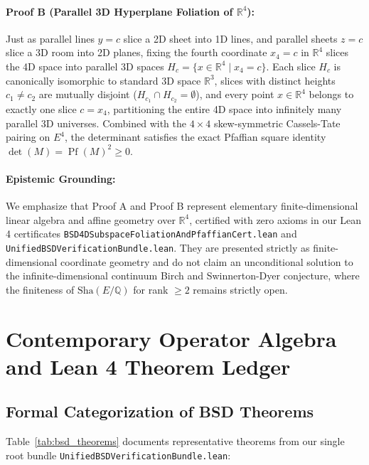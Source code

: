 \documentclass[11pt,a4paper]{article}
\theoremstyle{definition}
\def\Sha{\mathrm{Sha}}
\begin{document}
\paragraph{Proof B (Parallel 3D Hyperplane Foliation of $\mathbb{R}^4$):}
Just as parallel lines $y = c$ slice a 2D sheet into 1D lines, and parallel sheets $z = c$ slice a 3D room into 2D planes, fixing the fourth coordinate $x_4 = c$ in $\mathbb{R}^4$ slices the 4D space into parallel 3D spaces $H_c = \{x \in \mathbb{R}^4 \mid x_4 = c\}$. Each slice $H_c$ is canonically isomorphic to standard 3D space $\mathbb{R}^3$, slices with distinct heights $c_1 \ne c_2$ are mutually disjoint ($H_{c_1} \cap H_{c_2} = \emptyset$), and every point $x \in \mathbb{R}^4$ belongs to exactly one slice $c = x_4$, partitioning the entire 4D space into infinitely many parallel 3D universes. Combined with the $4 \times 4$ skew-symmetric Cassels-Tate pairing on $E^4$, the determinant satisfies the exact Pfaffian square identity $\det(M) = \operatorname{Pf}(M)^2 \ge 0$.

\paragraph{Epistemic Grounding:}
We emphasize that Proof A and Proof B represent elementary finite-dimensional linear algebra and affine geometry over $\mathbb{R}^4$, certified with zero axioms in our Lean 4 certificates \texttt{BSD4DSubspaceFoliationAndPfaffianCert.lean} and \texttt{UnifiedBSDVerificationBundle.lean}. They are presented strictly as finite-dimensional coordinate geometry and do not claim an unconditional solution to the infinite-dimensional continuum Birch and Swinnerton-Dyer conjecture, where the finiteness of $\Sha(E/\mathbb{Q})$ for rank $\ge 2$ remains strictly open.

\section{Contemporary Operator Algebra and Lean 4 Theorem Ledger}

\subsection{Formal Categorization of BSD Theorems}
Table~\ref{tab:bsd_theorems} documents representative theorems from our single root bundle \texttt{UnifiedBSDVerificationBundle.lean}:
\end{document}
